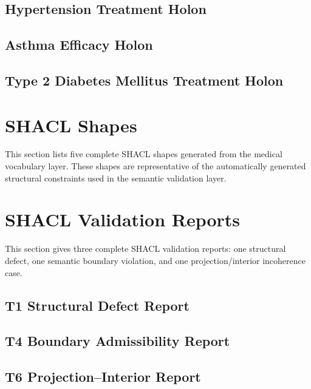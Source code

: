 \documentclass[10pt,a4paper]{article}
\newcommand{\artifact}[2]{%
  }
\begin{document}
\subsection{Hypertension Treatment Holon}
\artifact{holons/q_hypertension_treatment.ttl}{Complete RDF export for q\_hypertension\_treatment.}
\subsection{Asthma Efficacy Holon}
\artifact{holons/q_asthma_efficacy.ttl}{Complete RDF export for q\_asthma\_efficacy.}
\subsection{Type 2 Diabetes Mellitus Treatment Holon}
\artifact{holons/q_type_2_diabetes_mellitus_treatment.ttl}{Complete RDF export for q\_type\_2\_diabetes\_mellitus\_treatment.}

\section{SHACL Shapes}
\label{sec:shacl}
This section lists five complete SHACL shapes generated from the medical vocabulary layer. These shapes are representative of the automatically generated structural constraints used in the semantic validation layer.
\artifact{five_shacl_shapes.ttl}{Five complete generated SHACL shapes.}

\section{SHACL Validation Reports}
\label{sec:reports}
This section gives three complete SHACL validation reports: one structural defect, one semantic boundary violation, and one projection/interior incoherence case.

\subsection{T1 Structural Defect Report}
\artifact{shacl_reports/report_T1_T1_2000_setA.ttl}{SHACL report for T1 structural inconsistency.}
\subsection{T4 Boundary Admissibility Report}
\artifact{shacl_reports/report_T4_T4_2028_setA.ttl}{SHACL report for T4 semantic boundary inconsistency.}
\subsection{T6 Projection--Interior Report}
\artifact{shacl_reports/report_T6_T6_2042_setA.ttl}{SHACL report for T6 projection/interior inconsistency.}
\end{document}
